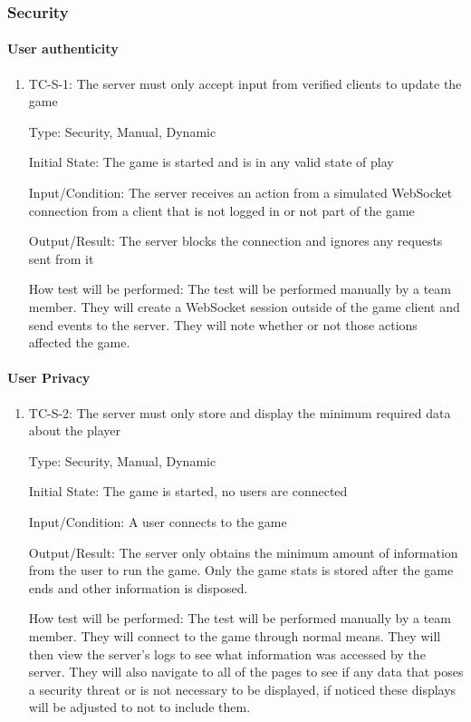 \documentclass[12pt, titlepage]{article}
\begin{document}
\subsubsection{Security}

\paragraph{User authenticity}

\begin{enumerate}
\item{TC-S-1: The server must only accept input from verified clients to update the game}

Type: Security, Manual, Dynamic
					
Initial State: The game is started and is in any valid state of play
					
Input/Condition: The server receives an action from a simulated WebSocket connection from a client that is not logged in or not part of the game
					
Output/Result: The server blocks the connection and ignores any requests sent from it
					
How test will be performed: The test will be performed manually by a team member. They will create a WebSocket session outside of the game client and send events to the server. They will note whether or not those actions affected the game.
\end{enumerate}

\paragraph{User Privacy}

\begin{enumerate}
\item{TC-S-2: The server must only store and display the minimum required data about the player}

Type: Security, Manual, Dynamic
					
Initial State: The game is started, no users are connected
					
Input/Condition: A user connects to the game
					
Output/Result: The server only obtains the minimum amount of information from the user to run the game. Only the game stats is stored after the game ends and other information is disposed.
					
How test will be performed: The test will be performed manually by a team member. They will connect to the game through normal means. They will then view the server's logs to see what information was accessed by the server. They will also navigate to all of the pages to see if any data that poses a security threat or is not necessary to be displayed, if noticed these displays will be adjusted to not to include them.
\end{enumerate}
\end{document}

